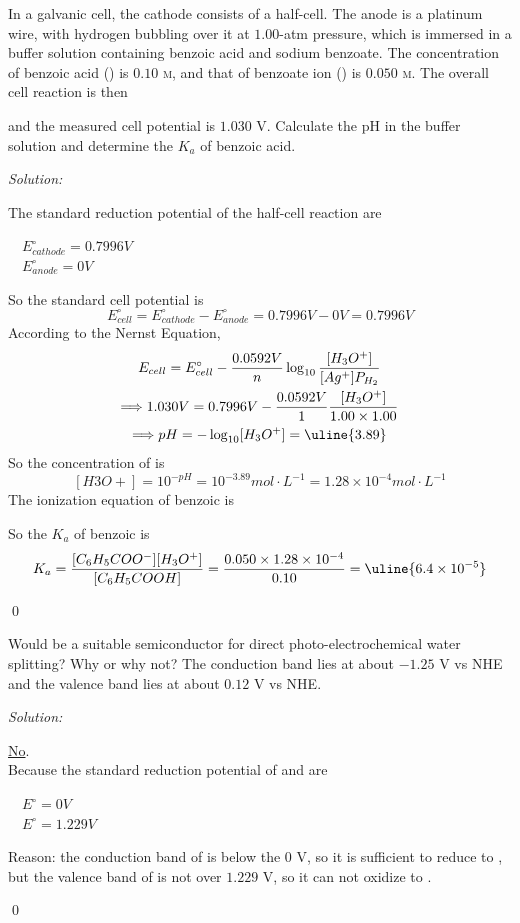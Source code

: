 \documentclass[12pt]{article}
\newenvironment{problem}[2][Problem]{\begin{trivlist}
\item[\hskip \labelsep {\bfseries #1}\hskip \labelsep {\bfseries #2.}]}{\end{trivlist}}
\newenvironment{sol}
    {\emph{Solution:}
    }
    {
    \qed
    }
\begin{document}
\begin{problem}{17.40}
In a galvanic cell, the cathode consists of a  half-cell. The anode is a platinum wire, with hydrogen bubbling over it at $1.00$-atm pressure, which is immersed in a buffer solution containing benzoic acid and sodium benzoate. The concentration of benzoic acid () is $0.10$ \textsc{m}, and that of benzoate ion () is $0.050$ \textsc{m}. The overall cell reaction is then
\begin{center}
\end{center}
and the measured cell potential is $1.030$ V. Calculate the pH in the buffer solution and determine the $K _a$ of benzoic acid.
\end{problem}
\begin{sol}
The standard reduction potential of the half-cell reaction are
\begin{center}
~~$E_{cathode}^{\circ}=0.7996V$\\
~~$E_{anode}^{\circ}=0V$
\end{center}
So the standard cell potential is
\[
E_{cell}^{\circ}=E_{cathode}^{\circ}-E_{anode}^{\circ}=0.7996V-0V=0.7996V
\]
According to the Nernst Equation,
\begin{gather*}
E_{cell}=E_{cell}^{\circ}-\frac{0.0592V}{n}\log_{10}\frac{[H_3O^+]}{[Ag^+]P_{H_2}}\\
\Longrightarrow1.030V=0.7996V-\frac{0.0592V}{1}\frac{[H_3O^+]}{1.00\times1.00}\\
\Longrightarrow pH=-\log_{10}[H_3O^+]=\uline{3.89}
\end{gather*}
So the concentration of  is
\[
[H3O+]=10^{-pH}=10^{-3.89}mol\cdot L^{-1}=1.28\times10^{-4}mol\cdot L^{-1}
\]
The ionization equation of benzoic is
\begin{center}
\end{center}
So the $K_a$ of benzoic is
\[
K_a=\frac{[C_6H_5COO^-][H_3O^+]}{[C_6H_5COOH]}=\frac{0.050\times1.28\times10^{-4}}{0.10}=\uline{6.4\times10^{-5}}
\]
\end{sol}

\begin{problem}{17.47}
Would  be a suitable semiconductor for direct photo-electrochemical water splitting? Why or why not? The conduction band lies at about $-1.25$ V vs NHE and the valence band lies at about $0.12$ V vs NHE.
\end{problem}
\begin{sol}
\uline{No}.\\
Because the standard reduction potential of  and  are
\begin{center}
~~$E^{\circ}=0V$\\
~~$E^{\circ}=1.229V$
\end{center}
Reason: the conduction band of  is below the $0$ V, so it is sufficient to reduce  to , but the valence band of  is not over $1.229$ V, so it can not oxidize  to .
\end{sol}
\end{document}
